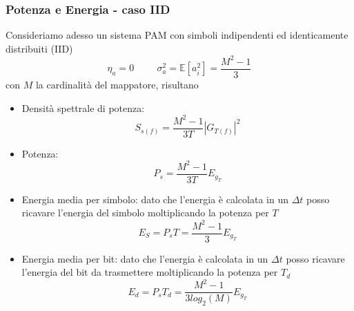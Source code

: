         \subsubsection{Potenza e Energia - caso IID}
            Consideriamo adesso un sistema PAM con simboli indipendenti ed identicamente distribuiti (IID)
            \[
                \eta_a = 0 \hspace{1cm} \sigma_a^2 = \mathbb{E}[a_i^2] = \frac{M^2-1}{3}    
            \]
            con $M$ la cardinalità del mappatore, risultano 
            \begin{itemize}
                \item {Densità spettrale di potenza:
                    \[
                        S_{s(f)} = \frac{M^2-1}{3T}\left|G_{T(f)}\right|^2
                    \]
                }
                \item {Potenza:
                    \[
                        P_s = \frac{M^2-1}{3T}E_{g_T}
                    \]
                }
                \item {Energia media per simbolo: dato che l'energia è calcolata in un $\Delta t$ posso ricavare l'energia del simbolo moltiplicando la potenza per $T$
                    \[
                        E_S = P_sT = \frac{M^2-1}{3}E_{g_T}
                    \]
                }
                \item {Energia media per bit: dato che l'energia è calcolata in un $\Delta t$ posso ricavare l'energia del bit da trasmettere
                moltiplicando la potenza per $T_d$
                    \[
                        E_d = P_sT_d = \frac{M^2-1}{3log_2(M)}E_{g_T}
                    \]
                }
            \end{itemize}
